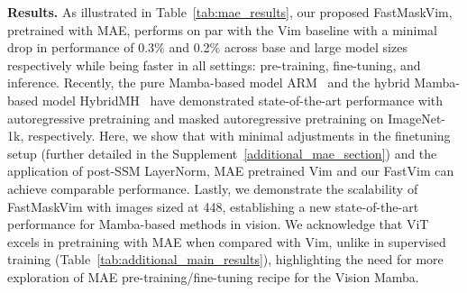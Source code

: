 \begin{table}[ht]
    \caption{Comparison of FastMaskVim with Vim and ViT, btoh pretrained with MAE, and other pretrained Vim based baselines ARM~\cite{arm} and HybridMH~\cite{hybridmh}. All models pre-trained with 224 image size on ImageNet-1k, and then end-to-end fine-tuned on 224 size image unless otherwise specified. B refers to Base, L to Large, H to Huge size models.}
    \vspace{-8pt}
    \begin{center}
\end{center}
\vspace{-4pt}
    \label{tab:mae_results}
\end{table}


\noindent \textbf{Results.} As illustrated in Table~\ref{tab:mae_results}, our proposed FastMaskVim, pretrained with MAE, performs on par with the Vim baseline with a minimal drop in performance of 0.3$\%$ and 0.2$\%$ across base and large model sizes respectively while being faster in all settings: pre-training, fine-tuning, and inference. Recently, the pure Mamba-based model ARM~\cite{arm} and the hybrid Mamba-based model HybridMH~\cite{hybridmh} have demonstrated state-of-the-art performance with autoregressive pretraining and masked autoregressive pretraining on ImageNet-1k, respectively. Here, we show that with minimal adjustments in the finetuning setup (further detailed in the Supplement~\ref{additional_mae_section}) and the application of post-SSM LayerNorm, MAE pretrained Vim and our FastVim can achieve comparable performance. Lastly, we demonstrate the scalability of FastMaskVim with images sized at 448, establishing a new state-of-the-art performance for Mamba-based methods in vision. We acknowledge that ViT excels in pretraining with MAE when compared with Vim, unlike in supervised training (Table~\ref{tab:additional_main_results}), highlighting the need for more exploration of MAE pre-training/fine-tuning recipe for the Vision Mamba. 

